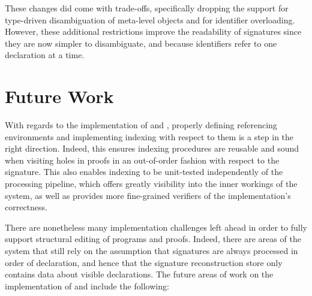 These changes did come with trade-offs, specifically dropping the support for type-driven disambiguation of meta-level objects and for identifier overloading.
However, these additional restrictions improve the readability of \Beluga signatures since they are now simpler to disambiguate, and because identifiers refer to one declaration at a time.

\section{Future Work}

With regards to the implementation of \Beluga and \Harpoon, properly defining referencing environments and implementing indexing with respect to them is a step in the right direction.
Indeed, this ensures indexing procedures are reusable and sound when visiting holes in \Harpoon proofs in an out-of-order fashion with respect to the \Beluga signature.
This also enables indexing to be unit-tested independently of the processing pipeline, which offers greatly visibility into the inner workings of the system, as well as provides more fine-grained verifiers of the implementation's correctness.

There are nonetheless many implementation challenges left ahead in order to fully support structural editing of \Beluga programs and \Harpoon proofs.
Indeed, there are areas of the system that still rely on the assumption that signatures are always processed in order of declaration, and hence that the signature reconstruction store only contains data about visible declarations.
The future areas of work on the implementation of \Beluga and \Harpoon include the following:

